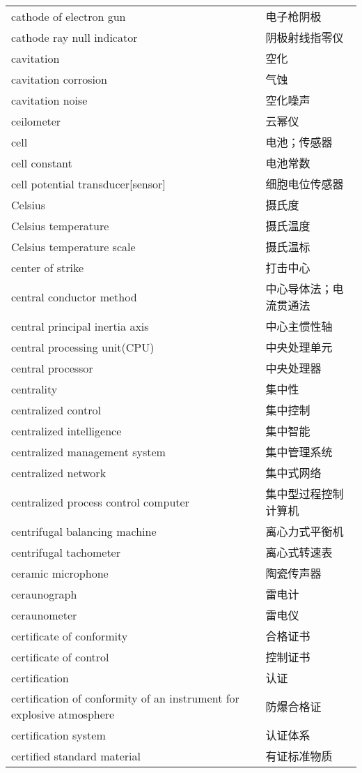 \documentclass[
]{article}
\begin{document}
\begin{longtable}[]{@{}ll@{}}
cathode of electron gun & 电子枪阴极 \\
cathode ray null indicator & 阴极射线指零仪 \\
cavitation & 空化 \\
cavitation corrosion & 气蚀 \\
cavitation noise & 空化噪声 \\
ceilometer & 云幂仪 \\
cell & 电池；传感器 \\
cell constant & 电池常数 \\
cell potential transducer{[}sensor{]} & 细胞电位传感器 \\
Celsius & 摄氏度 \\
Celsius temperature & 摄氏温度 \\
Celsius temperature scale & 摄氏温标 \\
center of strike & 打击中心 \\
central conductor method & 中心导体法；电流贯通法 \\
central principal inertia axis & 中心主惯性轴 \\
central processing unit(CPU) & 中央处理单元 \\
central processor & 中央处理器 \\
centrality & 集中性 \\
centralized control & 集中控制 \\
centralized intelligence & 集中智能 \\
centralized management system & 集中管理系统 \\
centralized network & 集中式网络 \\
centralized process control computer & 集中型过程控制计算机 \\
centrifugal balancing machine & 离心力式平衡机 \\
centrifugal tachometer & 离心式转速表 \\
ceramic microphone & 陶瓷传声器 \\
ceraunograph & 雷电计 \\
ceraunometer & 雷电仪 \\
certificate of conformity & 合格证书 \\
certificate of control & 控制证书 \\
certification & 认证 \\
certification of conformity of an instrument for explosive atmosphere &
防爆合格证 \\
certification system & 认证体系 \\
certified standard material & 有证标准物质 \\

\end{longtable}
\end{document}
